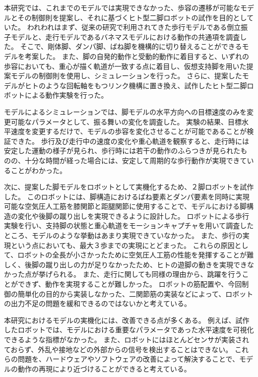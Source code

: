 本研究では、これまでのモデルでは実現できなかった、歩容の遷移が可能なモデルとその制御則を提案し、それに基づくヒト型二脚ロボットの試作を目的としていた。
われわれはまず、従来の研究で利用されてきた歩行モデルである倒立振子モデルと、走行モデルであるバネマスモデルにおける動作の共通項を調査した。
そこで、剛体脚、ダンパ脚、ばね脚を機構的に切り替えることができるモデルを考案した。
また、脚の自発的動作と受動的動作に着目すると、いずれの歩容においても、重心が描く軌道が一致する点に着目し、仮想支持脚を用いた提案モデルの制御則を使用し、シミュレーションを行った。
さらに、提案したモデルがヒトのような回転軸をもつリンク機構に置き換え、試作したヒト型二脚ロボットによる動作実験を行った。

モデルによるシミュレーションでは、脚モデルの水平方向への目標速度のみを変更可能なパラメータとして、振る舞いの変化を調査した。
実験の結果、目標水平速度を変更するだけで、モデルの歩容を変化させることが可能であることが検証できた。
歩行及び走行中の速度の変化や重心軌道を観察すると、走行時には安定した運動の様子が見られ、歩行時には若干の動作のふらつきが見られたものの、十分な時間が経った場合には、安定して周期的な歩行動作が実現できていることがわかった。

次に、提案した脚モデルをロボットとして実機化するため、２脚ロボットを試作した。
このロボットには、脚構造におけるばね要素とダンパ要素を同時に実現可能な空気圧人工筋を膝関節と距腿関節に使用することで、モデルにおける脚構造の変化や後脚の蹴り出しを実現できるように設計した。
ロボットによる歩行実験を行い、支持脚の状態と重心軌道をモーションキャプチャを用いて調査したところ、モデルのような挙動はあまり実現できていなかった。
また、歩行の実現という点においても、最大３歩までの実現にとどまった。
これらの原因として、ロボットの全長が小さかったために空気圧人工筋の性能を発揮することが難しく、後脚の蹴り出しの力が足りなかったため、ヒトの遊脚の動きを実現できなかった点が挙げられる。
また、走行に関しても同様の理由から、跳躍を行うことができず、動作を実現することが難しかった。
ロボットの筋配置や、今回制御の簡単化の目的から実装しなかった、二関節筋の実装などによって、ロボットの出力不足の問題を緩和できるのではないかと考えている。

本研究におけるモデルの実機化には、改善できる点が多くある。
例えば、試作したロボットでは、モデルにおける重要なパラメータであった水平速度を可視化できるような指標がなかった。
また、ロボットにはほとんどセンサが実装されておらず、外乱や接地などの外部からの信号を検出することはできない。
これらの問題を、ハードウェアやソフトウェアの改善によって解決することで、モデルの動作の再現により近づけることができると考えている。